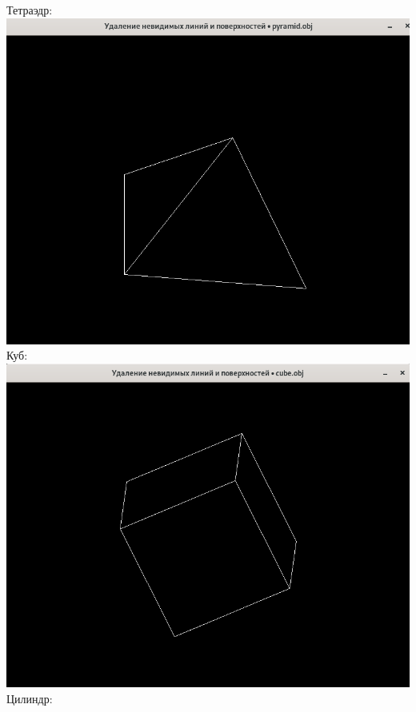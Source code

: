 \documentclass[a4paper,12pt]{article}
\begin{document}
\begin{flushleft}
  Тетраэдр:\linebreak
  \includegraphics[scale=1.5]{pyramid.png}\linebreak\linebreak
  Куб:\linebreak
  \includegraphics[scale=1.5]{cube.png}\linebreak\linebreak
  Цилиндр:\linebreak

\end{flushleft}
\end{document}
